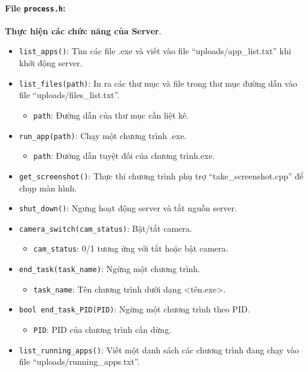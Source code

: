 \paragraph{File \texttt{process.h}:}{\textbf{Thực hiện các chức năng của Server}.}
\begin{itemize}
    \item \texttt{list\_apps()}: Tìm các file .exe và viết vào file “uploads/app\_list.txt” khi khởi động server.
        
    \item \texttt{list\_files(path)}: In ra các thư mục và file trong thư mục đường dẫn vào file “uploads/files\_list.txt”.
    \begin{itemize}
        \item \texttt{path}: Đường dẫn của thư mục cần liệt kê.
    \end{itemize}

    \item \texttt{run\_app(path)}: Chạy một chương trình .exe.
    \begin{itemize}
        \item \texttt{path}: Đường dẫn tuyệt đối của chương trình.exe.
    \end{itemize}

    \item \texttt{get\_screenshot()}: Thực thi chương trình phụ trợ “take\_screenshot.cpp” để chụp màn hình.

    \item \texttt{shut\_down()}: Ngưng hoạt động server và tắt nguồn server.

    \item \texttt{camera\_switch(cam\_status)}: Bật/tắt camera.
    \begin{itemize}
        \item \texttt{cam\_status}: 0/1 tương ứng với tắt hoặc bật camera.
    \end{itemize}

    \item \texttt{end\_task(task\_name)}: Ngừng một chương trình.
    \begin{itemize}
        \item \texttt{task\_name}: Tên chương trình dưới dạng <tên.exe>.
    \end{itemize}

    \item \texttt{bool end\_task\_PID(PID)}: Ngừng một chương trình theo PID.
    \begin{itemize}
        \item \texttt{PID}: PID của chương trình cần dừng.
    \end{itemize}

    \item \texttt{list\_running\_apps()}: Viết một danh sách các chương trình đang chạy vào file “uploads/running\_apps.txt”.
\end{itemize}
    
